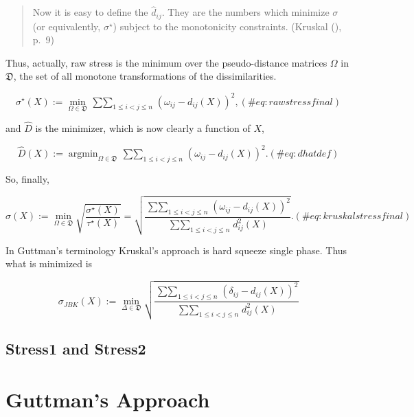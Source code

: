 \documentclass[
  12pt,
  letterpaper,
  DIV=11,
  numbers=noendperiod]{scrreprt}
\theoremstyle{remark}
\begin{document}
\begin{quote}
Now it is easy to define the \(\hat d_{ij}\). They are the numbers which
minimize \(\sigma\) (or equivalently, \(\sigma^\star\)) subject to the
monotonicity constraints. (Kruskal (),
p.~9)
\end{quote}

Thus, actually, raw stress is the minimum over the pseudo-distance
matrices \(\Omega\) in \(\mathfrak{D}\), the set of all monotone
transformations of the dissimilarities.

\begin{equation}
\sigma^\star(X):=\min_{\Omega\in\mathfrak{D}}\mathop{\sum\sum}_{1\leq i<j\leq n} (\omega_{ij}-d_{ij}(X))^2,
(\#eq:rawstressfinal)
\end{equation}

and \(\hat D\) is the minimizer, which is now clearly a function of
\(X\),

\begin{equation}
\hat D(X):=\mathop{\text{argmin}}_{\Omega\in\mathfrak{D}}\mathop{\sum\sum}_{1\leq i<j\leq n} (\omega_{ij}-d_{ij}(X))^2.
(\#eq:dhatdef)
\end{equation}

So, finally,

\begin{equation}
\sigma(X):=\min_{\Omega\in\mathfrak{D}}\sqrt{\frac{\sigma^\star(X)}{\tau^\star(X)}}=\sqrt{\frac{\mathop{\sum\sum}_{1\leq i<j\leq n} (\omega_{ij}-d_{ij}(X))^2}{\mathop{\sum\sum}_{1\leq i<j\leq n} d_{ij}^2(X)}}.
(\#eq:kruskalstressfinal)
\end{equation}

In Guttman's terminology Kruskal's approach is hard squeeze single
phase. Thus what is minimized is

\[
\sigma_{JBK}^{\ }(X):=\min_{ \Delta\in\mathfrak{D}}\sqrt{\frac{\mathop{\sum\sum}_{1\leq i<j\leq n}(\delta_{ij}-d_{ij}(X))^2}{\mathop{\sum\sum}_{1\leq i<j\leq n}d_{ij}^2(X)}}
\]

\subsection{Stress1 and Stress2}\label{stress1-and-stress2}

\section{Guttman's Approach}\label{nmdsguttman}
\end{document}
